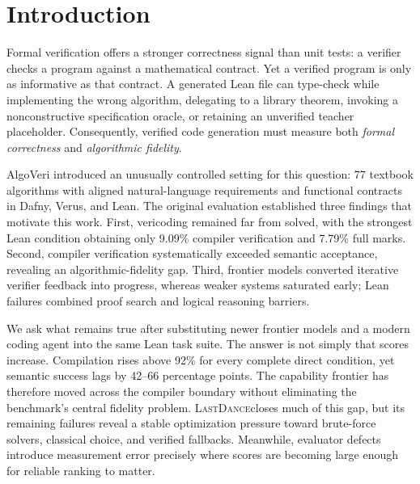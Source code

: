 \documentclass{article}
\newcommand{\lastdance}{\textsc{LastDance}}
\begin{document}
\begin{abstract}
These results confirm AlgoVeri's algorithmic-fidelity gap, extend its finding that
frontier systems exploit iterative repair, and revise the characterization of Lean's
barrier: compilation is no longer the principal failure mode for the evaluated
frontier systems, while semantic degeneracy remains pervasive.  We additionally find
that one immutable scaffold is malformed, 12 tasks expose a contradiction between
teacher-permitted \texttt{sorry} and the judge policy, and two temperature-zero judges
disagree on 22/334 compiled condition--task pairs.  We release all generations,
judge views, case-level analyses, an agent harness, and an interactive audit dashboard.
Our evidence motivates a multi-axis protocol that reports output coverage, formal
verification, algorithmic fidelity, and evaluator robustness separately.
\end{abstract}

\section{Introduction}

Formal verification offers a stronger correctness signal than unit tests: a verifier
checks a program against a mathematical contract.  Yet a verified program is only as
informative as that contract.  A generated Lean file can type-check while implementing
the wrong algorithm, delegating to a library theorem, invoking a nonconstructive
specification oracle, or retaining an unverified teacher placeholder.  Consequently,
verified code generation must measure both \emph{formal correctness} and
\emph{algorithmic fidelity}.

AlgoVeri introduced an unusually controlled setting for this question: 77 textbook
algorithms with aligned natural-language requirements and functional contracts in
Dafny, Verus, and Lean\cite{zhao2026algoveri}.  The original evaluation established
three findings that motivate this work.  First, vericoding remained far from solved,
with the strongest Lean condition obtaining only 9.09\% compiler verification and
7.79\% full marks.  Second, compiler verification systematically exceeded semantic
acceptance, revealing an algorithmic-fidelity gap.  Third, frontier models converted
iterative verifier feedback into progress, whereas weaker systems saturated early;
Lean failures combined proof search and logical reasoning barriers.

We ask what remains true after substituting newer frontier models and a modern coding
agent into the same Lean task suite.  The answer is not simply that scores increase.
Compilation rises above 92\% for every complete direct condition, yet semantic success
lags by 42--66 percentage points.  The capability frontier has therefore moved across
the compiler boundary without eliminating the benchmark's central fidelity problem.
\lastdance closes much of this gap, but its remaining failures reveal
a stable optimization pressure toward brute-force solvers, classical choice, and
verified fallbacks.  Meanwhile, evaluator defects introduce measurement error precisely
where scores are becoming large enough for reliable ranking to matter.
\end{document}
